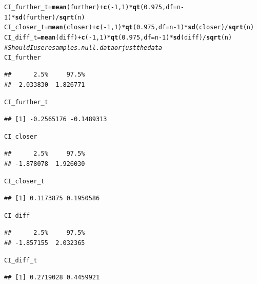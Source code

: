 \documentclass{article}\usepackage[]{graphicx}\usepackage[]{xcolor}
\makeatletter
\newcommand{\hlnum}[1]{\textcolor[rgb]{0.686,0.059,0.569}{#1}}%
\newcommand{\hlcom}[1]{\textcolor[rgb]{0.678,0.584,0.686}{\textit{#1}}}%
\newcommand{\hlopt}[1]{\textcolor[rgb]{0,0,0}{#1}}%
\newcommand{\hldef}[1]{\textcolor[rgb]{0.345,0.345,0.345}{#1}}%
\newcommand{\hlkwb}[1]{\textcolor[rgb]{0.69,0.353,0.396}{#1}}%
\newcommand{\hlkwc}[1]{\textcolor[rgb]{0.333,0.667,0.333}{#1}}%
\newcommand{\hlkwd}[1]{\textcolor[rgb]{0.737,0.353,0.396}{\textbf{#1}}}%
\newenvironment{kframe}{%
 \def\at@end@of@kframe{}%
 \ifinner\ifhmode%
  \def\at@end@of@kframe{\end{minipage}}%
  \begin{minipage}{\columnwidth}%
 \fi\fi%
 \def\FrameCommand##1{\hskip\@totalleftmargin \hskip-\fboxsep
 \colorbox{shadecolor}{##1}\hskip-\fboxsep
     \hskip-\linewidth \hskip-\@totalleftmargin \hskip\columnwidth}%
 \MakeFramed {\advance\hsize-\width
   \@totalleftmargin\z@ \linewidth\hsize
   \@setminipage}}%
 {\par\unskip\endMakeFramed%
 \at@end@of@kframe}
\newenvironment{knitrout}{}{} %
\makeatother
\begin{document}
\begin{enumerate}
\begin{enumerate}
\begin{knitrout}
\begin{kframe}
\begin{alltt}
\hldef{CI_further_t} \hlkwb{=} \hlkwd{mean}\hldef{(further)} \hlopt{+} \hlkwd{c}\hldef{(}\hlopt{-}\hlnum{1}\hldef{,} \hlnum{1}\hldef{)} \hlopt{*} \hlkwd{qt}\hldef{(}\hlnum{0.975}\hldef{,} \hlkwc{df} \hldef{= n}\hlopt{-}\hlnum{1}\hldef{)} \hlopt{*} \hlkwd{sd}\hldef{(further)}\hlopt{/}\hlkwd{sqrt}\hldef{(n)}
\hldef{CI_closer_t} \hlkwb{=} \hlkwd{mean}\hldef{(closer)} \hlopt{+} \hlkwd{c}\hldef{(}\hlopt{-}\hlnum{1}\hldef{,} \hlnum{1}\hldef{)} \hlopt{*} \hlkwd{qt}\hldef{(}\hlnum{0.975}\hldef{,} \hlkwc{df} \hldef{= n}\hlopt{-}\hlnum{1}\hldef{)} \hlopt{*} \hlkwd{sd}\hldef{(closer)}\hlopt{/}\hlkwd{sqrt}\hldef{(n)}
\hldef{CI_diff_t} \hlkwb{=} \hlkwd{mean}\hldef{(diff)} \hlopt{+} \hlkwd{c}\hldef{(}\hlopt{-}\hlnum{1}\hldef{,} \hlnum{1}\hldef{)} \hlopt{*} \hlkwd{qt}\hldef{(}\hlnum{0.975}\hldef{,} \hlkwc{df} \hldef{= n}\hlopt{-}\hlnum{1}\hldef{)} \hlopt{*} \hlkwd{sd}\hldef{(diff)}\hlopt{/}\hlkwd{sqrt}\hldef{(n)}
\hlcom{#Should I use resamples.null.data or just the data}
\hldef{CI_further}
\end{alltt}
\begin{verbatim}
##      2.5%     97.5% 
## -2.033830  1.826771
\end{verbatim}
\begin{alltt}
\hldef{CI_further_t}
\end{alltt}
\begin{verbatim}
## [1] -0.2565176 -0.1489313
\end{verbatim}
\begin{alltt}
\hldef{CI_closer}
\end{alltt}
\begin{verbatim}
##      2.5%     97.5% 
## -1.878078  1.926030
\end{verbatim}
\begin{alltt}
\hldef{CI_closer_t}
\end{alltt}
\begin{verbatim}
## [1] 0.1173875 0.1950586
\end{verbatim}
\begin{alltt}
\hldef{CI_diff}
\end{alltt}
\begin{verbatim}
##      2.5%     97.5% 
## -1.857155  2.032365
\end{verbatim}
\begin{alltt}
\hldef{CI_diff_t}
\end{alltt}
\begin{verbatim}
## [1] 0.2719028 0.4459921
\end{verbatim}
\end{kframe}
\end{knitrout}
  

\end{enumerate}
\end{enumerate}
\end{document}
